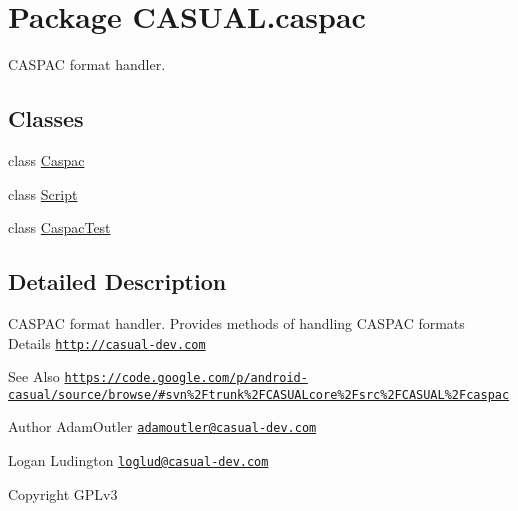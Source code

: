 \hypertarget{namespaceCASUAL_1_1caspac}{\section{Package C\-A\-S\-U\-A\-L.\-caspac}
\label{namespaceCASUAL_1_1caspac}
}


C\-A\-S\-P\-A\-C format handler.  


\subsection*{Classes}
\begin{DoxyCompactItemize}
\item 
class \hyperlink{classCASUAL_1_1caspac_1_1Caspac}{Caspac}
\item 
class \hyperlink{classCASUAL_1_1caspac_1_1Script}{Script}
\item 
class \hyperlink{classCASUAL_1_1caspac_1_1CaspacTest}{Caspac\-Test}
\end{DoxyCompactItemize}


\subsection{Detailed Description}
C\-A\-S\-P\-A\-C format handler. Provides methods of handling C\-A\-S\-P\-A\-C formats Details \href{http://casual-dev.com}{\tt http\-://casual-\/dev.\-com} \begin{DoxySeeAlso}{See Also}
\href{https://code.google.com/p/android-casual/source/browse/#svn%2Ftrunk%2FCASUALcore%2Fsrc%2FCASUAL%2Fcaspac}{\tt https\-://code.\-google.\-com/p/android-\/casual/source/browse/\#svn\%2\-Ftrunk\%2\-F\-C\-A\-S\-U\-A\-Lcore\%2\-Fsrc\%2\-F\-C\-A\-S\-U\-A\-L\%2\-Fcaspac} 
\end{DoxySeeAlso}
\begin{DoxyAuthor}{Author}
Adam\-Outler \href{mailto:adamoutler@casual-dev.com}{\tt adamoutler@casual-\/dev.\-com} 

Logan Ludington \href{mailto:loglud@casual-dev.com}{\tt loglud@casual-\/dev.\-com} 
\end{DoxyAuthor}
\begin{DoxyCopyright}{Copyright}
G\-P\-Lv3 
\end{DoxyCopyright}
